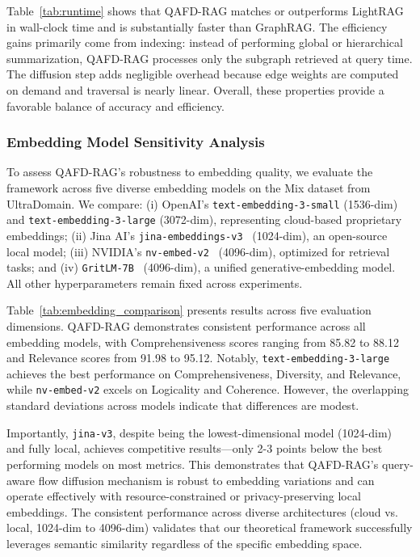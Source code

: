 \documentclass{article} %
\begin{document}
{
Table~\ref{tab:runtime} shows that {QAFD-RAG} matches or outperforms {LightRAG} in wall-clock time and is substantially faster than {GraphRAG}.
The efficiency gains primarily come from indexing: instead of performing global or hierarchical summarization, QAFD-RAG processes only the subgraph retrieved at query time.
The diffusion step adds negligible overhead because edge weights are computed on demand and traversal is nearly linear.
Overall, these properties provide a favorable balance of accuracy and efficiency.
}



\subsubsection{{Embedding Model Sensitivity Analysis}}
\label{sec:embedding_sensitivity}
{
To assess QAFD-RAG's robustness to embedding quality, we evaluate the framework across five diverse embedding models on the Mix dataset from UltraDomain. We compare: (i) OpenAI's \texttt{text-embedding-3-small} (1536-dim) and \texttt{text-embedding-3-large} (3072-dim), representing cloud-based proprietary embeddings; (ii) Jina AI's \texttt{jina-embeddings-v3}~\citep{sturua2024jina} (1024-dim), an open-source local model; (iii) NVIDIA's \texttt{nv-embed-v2}~\citep{lee2024nv} (4096-dim), optimized for retrieval tasks; and (iv) \texttt{GritLM-7B}~\citep{muennighoff2024generative} (4096-dim), a unified generative-embedding model. All other hyperparameters remain fixed across experiments.

Table~\ref{tab:embedding_comparison} presents results across five evaluation dimensions. QAFD-RAG demonstrates consistent performance across all embedding models, with Comprehensiveness scores ranging from 85.82 to 88.12 and Relevance scores from 91.98 to 95.12. Notably, \texttt{text-embedding-3-large} achieves the best performance on Comprehensiveness, Diversity, and Relevance, while \texttt{nv-embed-v2} excels on Logicality and Coherence. However, the overlapping standard deviations across models indicate that differences are modest. 

Importantly, \texttt{jina-v3}, despite being the lowest-dimensional model (1024-dim) and fully local, achieves competitive results—only 2-3 points below the best performing models on most metrics. This demonstrates that QAFD-RAG's query-aware flow diffusion mechanism is robust to embedding variations and can operate effectively with resource-constrained or privacy-preserving local embeddings. The consistent performance across diverse architectures (cloud vs. local, 1024-dim to 4096-dim) validates that our theoretical framework successfully leverages semantic similarity regardless of the specific embedding space.}
\end{document}

